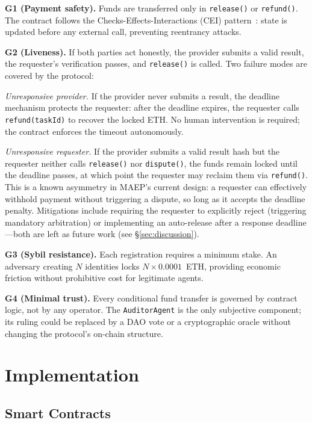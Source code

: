 \documentclass[conference]{IEEEtran}
\begin{document}
\textbf{G1 (Payment safety).}
Funds are transferred only in \texttt{release()} or \texttt{refund()}.
The contract follows the Checks-Effects-Interactions (CEI)
pattern~\cite{consensys_patterns}: state is updated before any
external call, preventing reentrancy attacks.

\textbf{G2 (Liveness).}
If both parties act honestly, the provider submits a valid result, the
requester's verification passes, and \texttt{release()} is called.
Two failure modes are covered by the protocol:

\emph{Unresponsive provider.}  If the provider never submits a result,
the deadline mechanism protects the requester: after the deadline
expires, the requester calls \texttt{refund(taskId)} to recover the
locked ETH.  No human intervention is required; the contract enforces
the timeout autonomously.

\emph{Unresponsive requester.}  If the provider submits a valid result
hash but the requester neither calls \texttt{release()} nor
\texttt{dispute()}, the funds remain locked until the deadline passes,
at which point the requester may reclaim them via \texttt{refund()}.
This is a known asymmetry in MAEP's current design: a requester can
effectively withhold payment without triggering a dispute, so long as
it accepts the deadline penalty.  Mitigations include requiring the
requester to explicitly reject (triggering mandatory arbitration) or
implementing an auto-release after a response deadline---both are left
as future work (see \S\ref{sec:discussion}).

\textbf{G3 (Sybil resistance).}
Each registration requires a minimum stake.  An adversary creating
$N$ identities locks $N \times 0.0001$~ETH, providing economic
friction without prohibitive cost for legitimate agents.

\textbf{G4 (Minimal trust).}
Every conditional fund transfer is governed by contract logic, not by
any operator.  The \texttt{AuditorAgent} is the only subjective
component; its ruling could be replaced by a DAO vote or a
cryptographic oracle without changing the protocol's on-chain
structure.

\section{Implementation}
\label{sec:implementation}

\subsection{Smart Contracts}
\end{document}
